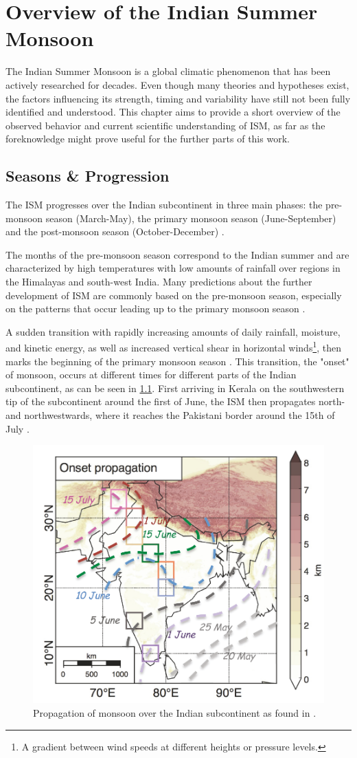 \chapter{Overview of the Indian Summer Monsoon}
\label{c:ism_overview}
The Indian Summer Monsoon is a global climatic phenomenon that has been actively researched for decades. Even though many theories and hypotheses exist, the factors influencing its strength, timing and variability have still not been fully identified and understood. This chapter aims to provide a short overview of the observed behavior and current scientific understanding of ISM, as far as the foreknowledge might prove useful for the further parts of this work.


\section{Seasons \& Progression}
\label{st:ism_seasons}
The ISM progresses over the Indian subcontinent in three main phases: the pre-monsoon season (March-May), the primary monsoon season (June-September) and the post-monsoon season (October-December) \citep{Stolbova.2015}.

The months of the pre-monsoon season correspond to the Indian summer and are characterized by high temperatures with low amounts of rainfall over regions in the Himalayas and south-west India. Many predictions about the further development of ISM are commonly based on the pre-monsoon season, especially on the patterns that occur leading up to the primary monsoon season \citep{Stolbova.2015}.

A sudden transition with rapidly increasing amounts of daily rainfall, moisture, and kinetic energy, as well as increased vertical shear in horizontal winds\footnote{A gradient between wind speeds at different heights or pressure levels.}, then marks the beginning of the primary monsoon season \citep{Pradhan.2017}. This transition, the "onset" of monsoon, occurs at different times for different parts of the Indian subcontinent, as can be seen in \cref{fig:onset_propagation}. First arriving in Kerala on the southwestern tip of the subcontinent around the first of June, the ISM then propagates north- and northwestwards, where it reaches the Pakistani border around the 15th of July \citep{Willetts.2017}.

\begin{figure}[h]
  \centering
  \includegraphics[width=0.45\linewidth]{./99_appendix/img/stolbova_propagation}
  \caption{Propagation of monsoon over the Indian subcontinent as found in \citet{Stolbova.2015}.}
  \label{fig:onset_propagation}
\end{figure}

